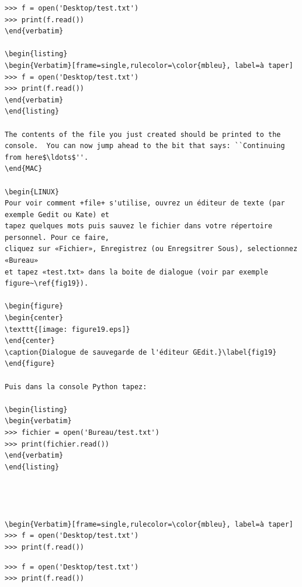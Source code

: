 \begin{MAC}
\begin{Verbatim}[frame=single,rulecolor=\color{mbleu}, label=à taper]
>>> f = open('Desktop/test.txt')
>>> print(f.read())
\end{verbatim}

\begin{listing}
\begin{Verbatim}[frame=single,rulecolor=\color{mbleu}, label=à taper]
>>> f = open('Desktop/test.txt')
>>> print(f.read())
\end{verbatim}
\end{listing}

The contents of the file you just created should be printed to the console.  You can now jump ahead to the bit that says: ``Continuing from here$\ldots$''.
\end{MAC}

\begin{LINUX}
Pour voir comment +file+ s'utilise, ouvrez un éditeur de texte (par exemple Gedit ou Kate) et 
tapez quelques mots puis sauvez le fichier dans votre répertoire personnel. Pour ce faire,
cliquez sur «Fichier», Enregistrez (ou Enregsitrer Sous), selectionnez «Bureau»
et tapez «test.txt» dans la boite de dialogue (voir par exemple figure~\ref{fig19}).

\begin{figure}
\begin{center}
\texttt{[image: figure19.eps]}
\end{center}
\caption{Dialogue de sauvegarde de l'éditeur GEdit.}\label{fig19}
\end{figure}

Puis dans la console Python tapez:

\begin{listing}
\begin{verbatim}
>>> fichier = open('Bureau/test.txt')
>>> print(fichier.read())
\end{verbatim}
\end{listing}




\begin{Verbatim}[frame=single,rulecolor=\color{mbleu}, label=à taper]
>>> f = open('Desktop/test.txt')
>>> print(f.read())
\end{Verbatim}

\begin{listing}
\begin{Verbatim}[frame=single,rulecolor=\color{mbleu}, label=à taper]
>>> f = open('Desktop/test.txt')
>>> print(f.read())
\end{Verbatim}
\end{listing}


\end{MAC}
